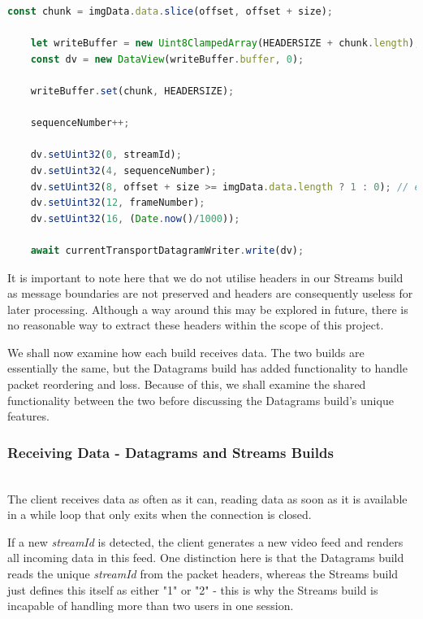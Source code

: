 \begin{lstlisting}[language=javascript, caption={The encoding and transmission of our video data.}, label=lst:callahan]
    const chunk = imgData.data.slice(offset, offset + size);

    let writeBuffer = new Uint8ClampedArray(HEADERSIZE + chunk.length);
    const dv = new DataView(writeBuffer.buffer, 0);

    writeBuffer.set(chunk, HEADERSIZE);
    
    sequenceNumber++;

    dv.setUint32(0, streamId);
    dv.setUint32(4, sequenceNumber);  
    dv.setUint32(8, offset + size >= imgData.data.length ? 1 : 0); // eof
    dv.setUint32(12, frameNumber);
    dv.setUint32(16, (Date.now()/1000));

    await currentTransportDatagramWriter.write(dv); 
\end{lstlisting}

It is important to note here that we do not utilise headers in our Streams build as message boundaries are not preserved and headers are consequently useless for later processing. Although a way around this may be explored in future, there is no reasonable way to extract these headers within the scope of this project.

We shall now examine how each build receives data. The two builds are essentially the same, but the Datagrams build has added functionality to handle packet reordering and loss. Because of this, we shall examine the shared functionality between the two before discussing the Datagrams build's unique features.
\hfill\\
\subsubsection{Receiving Data - Datagrams and Streams Builds}
\hfill\\
The client receives data as often as it can, reading data as soon as it is available in a while loop that only exits when the connection is closed. 

If a new \textit{streamId} is detected, the client generates a new video feed and renders all incoming data in this feed. One distinction here is that the Datagrams build reads the unique \textit{streamId} from the packet headers, whereas the Streams build just defines this itself as either "1" or "2" - this is why the Streams build is incapable of handling more than two users in one session. 

